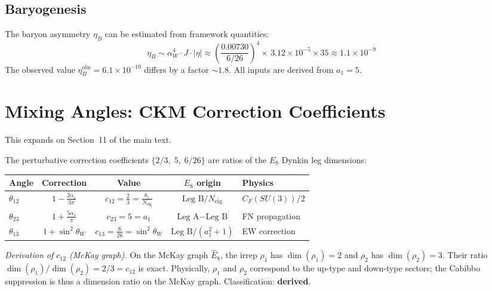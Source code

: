 \documentclass[12pt,a4paper]{article}
\theoremstyle{definition}
\begin{document}
\subsection{Baryogenesis}

The baryon asymmetry $\eta_B$ can be estimated from framework quantities:
\begin{equation}
\eta_B \sim \alpha_W^4 \cdot J \cdot |\eta| \approx \left(\frac{0.00730}{6/26}\right)^{\!4} \!\times\, 3.12 \times 10^{-5} \times 35 \approx 1.1 \times 10^{-9}
\end{equation}
The observed value $\eta_B^{\text{obs}} = 6.1 \times 10^{-10}$ differs by a factor $\sim 1.8$.  All inputs are derived from $a_1 = 5$.


\section{Mixing Angles: CKM Correction Coefficients}
\label{sec:S-mixing}

This expands on Section~11 of the main text.

The perturbative correction coefficients $\{2/3,\; 5,\; 6/26\}$ are ratios of the $E_8$ Dynkin leg dimensions:

\begin{center}
\begin{tabular}{lcccl}
\toprule
\textbf{Angle} & \textbf{Correction} & \textbf{Value} & \textbf{$E_8$ origin} & \textbf{Physics} \\
\midrule
$\theta_{12}$ & $1 - \frac{2\alpha_s}{3\pi}$ & $c_{12} = \frac{2}{3} = \frac{b_1}{N_{\text{eig}}}$ & $\text{Leg~B} / N_{\text{eig}}$ & $C_F(SU(3))/2$ \\[4pt]
$\theta_{23}$ & $1 + \frac{5\alpha_s}{\pi}$ & $c_{23} = 5 = a_1$ & $\text{Leg~A} - \text{Leg~B}$ & FN propagation \\[4pt]
$\theta_{13}$ & $1 + \sin^2\theta_W$ & $c_{13} = \frac{6}{26} = \sin^2\theta_W$ & $\text{Leg~B}/(a_1^2+1)$ & EW correction \\
\bottomrule
\end{tabular}
\end{center}

\textit{Derivation of $c_{12}$ (McKay graph).}  On the McKay graph $\hat{E}_8$, the irrep $\rho_1$ has $\dim(\rho_1) = 2$ and $\rho_2$ has $\dim(\rho_2) = 3$.  Their ratio $\dim(\rho_1)/\dim(\rho_2) = 2/3 = c_{12}$ is exact.  Physically, $\rho_1$ and $\rho_2$ correspond to the up-type and down-type sectors; the Cabibbo suppression is thus a dimension ratio on the McKay graph.  Classification: \textbf{derived}.
\end{document}

